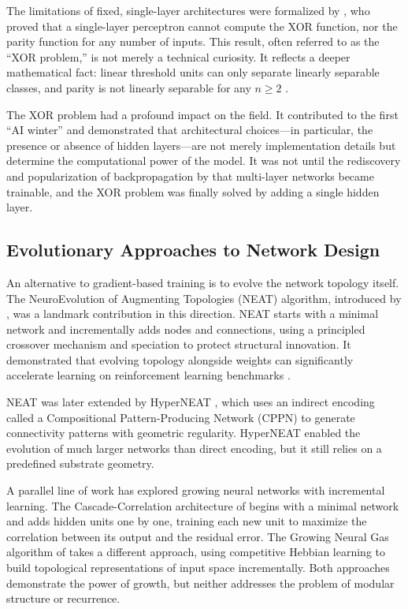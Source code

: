 The limitations of fixed, single-layer architectures were formalized by
\citet{minsky1969perceptrons}, who proved that a single-layer perceptron
cannot compute the XOR function, nor the parity function for any number
of inputs. This result, often referred to as the ``XOR problem,'' is not
merely a technical curiosity. It reflects a deeper mathematical fact:
linear threshold units can only separate linearly separable classes, and
parity is not linearly separable for any $n \geq 2$ \citep{minsky1969perceptrons}.

The XOR problem had a profound impact on the field. It contributed to
the first ``AI winter'' and demonstrated that architectural choices—in
particular, the presence or absence of hidden layers—are not merely
implementation details but determine the computational power of the
model. It was not until the rediscovery and popularization of
backpropagation by \citet{rumelhart1986learning} that multi-layer
networks became trainable, and the XOR problem was finally solved by
adding a single hidden layer.

\subsection{Evolutionary Approaches to Network Design}

An alternative to gradient-based training is to evolve the network
topology itself. The NeuroEvolution of Augmenting Topologies (NEAT)
algorithm, introduced by \citet{stanley2002evolving}, was a landmark
contribution in this direction. NEAT starts with a minimal network and
incrementally adds nodes and connections, using a principled crossover
mechanism and speciation to protect structural innovation. It
demonstrated that evolving topology alongside weights can significantly
accelerate learning on reinforcement learning benchmarks
\citep{stanley2002evolving,stanley2002efficient}.

NEAT was later extended by HyperNEAT \citep{stanley2009hypercube}, which
uses an indirect encoding called a Compositional Pattern-Producing
Network (CPPN) to generate connectivity patterns with geometric
regularity. HyperNEAT enabled the evolution of much larger networks than
direct encoding, but it still relies on a predefined substrate geometry.

A parallel line of work has explored growing neural networks with
incremental learning. The Cascade-Correlation architecture of
\citet{fahlman1990cascade} begins with a minimal network and adds hidden
units one by one, training each new unit to maximize the correlation
between its output and the residual error. The Growing Neural Gas
algorithm of \citet{fritzke1995growing} takes a different approach,
using competitive Hebbian learning to build topological representations
of input space incrementally. Both approaches demonstrate the power of
growth, but neither addresses the problem of modular structure or
recurrence.

